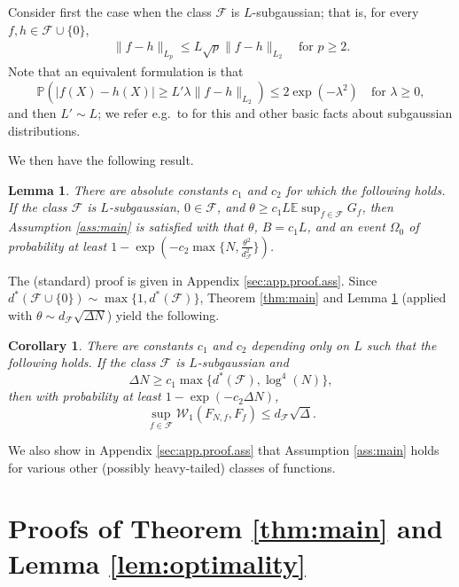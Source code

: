 \documentclass[11pt]{amsart}
\newcommand{\W}{\mathcal{W}}
\newtheorem{lemma}[theorem]{Lemma}
\newtheorem{corollary}[theorem]{Corollary}
\theoremstyle{definition}
\newcommand{\E}{\mathbb{E}}
\renewcommand{\P}{\mathbb{P}}
\numberwithin{equation}{section}
\begin{document}
Consider first the case when the class $\mathcal{F}$ is $L$-subgaussian; that is, for every $f,h\in\mathcal{F}\cup\{0\}$,
\begin{align}
\label{eq:def.subgaussian}
 \|f-h\|_{L_p}\leq L \sqrt p \|f-h\|_{L_2} 
 \quad\text{for } p \geq 2.
\end{align}
Note that an equivalent formulation is that 
\[
\P\left( |f(X)-h(X)| \geq L' \lambda \|f-h\|_{L_2} \right)
\leq 2\exp(-\lambda^2)
\quad \text{for }\lambda\geq 0,
\]
and then $L'\sim L$; we refer e.g.\ to \cite{vershynin2018high} for this and other basic facts about subgaussian distributions.

We then have the following result.

\begin{lemma}
\label{prop:assumption.gaussian}
There are absolute constants $c_{1}$ and $c_2$ for which the following holds.
If the class $\mathcal{F}$ is $L$-subgaussian, $0\in\mathcal{F}$, and $\theta\geq c_1 L \E \sup_{f\in\mathcal{F}} G_f $, then Assumption \ref{ass:main} is satisfied with that $\theta$, $B=c_{1}L$, and an event $\Omega_{0}$ of probability at least $1-\exp(-c_2\max\{ N,\frac{\theta^2}{d^2_{\mathcal{F}}}\})$.
\end{lemma}

The (standard) proof  is given in Appendix \ref{sec:app.proof.ass}. 
Since $d^\ast(\mathcal{F}\cup\{0\})\sim \max\{ 1, d^\ast(\mathcal{F})\}$, Theorem \ref{thm:main} and Lemma \ref{prop:assumption.gaussian} (applied with $\theta\sim d_{\mathcal{F}}\sqrt{\Delta N}$) yield the following.

\begin{corollary}
\label{cor:W1.subgauss}
There are constants $c_{1}$ and $c_2$ depending only on $L$ such that the following holds.
If the class $\mathcal{F}$ is $L$-subgaussian and 
\[
\Delta N \geq c_1 \max\{ d^\ast(\mathcal{F}), \log^4(N)\},
\]
then with probability at least $1-\exp(-c_2\Delta N)$,
\[
\sup_{f\in\mathcal{F}} \W_1(F_{N,f},F_f) \leq d_\mathcal{F} \sqrt\Delta .
\]
\end{corollary}

We also show in Appendix \ref{sec:app.proof.ass} that Assumption \ref{ass:main} holds for various other (possibly heavy-tailed) classes of functions.




\section{Proofs of Theorem \ref{thm:main} and Lemma \ref{lem:optimality}}
\label{sec:proof.main} 
\end{document}
